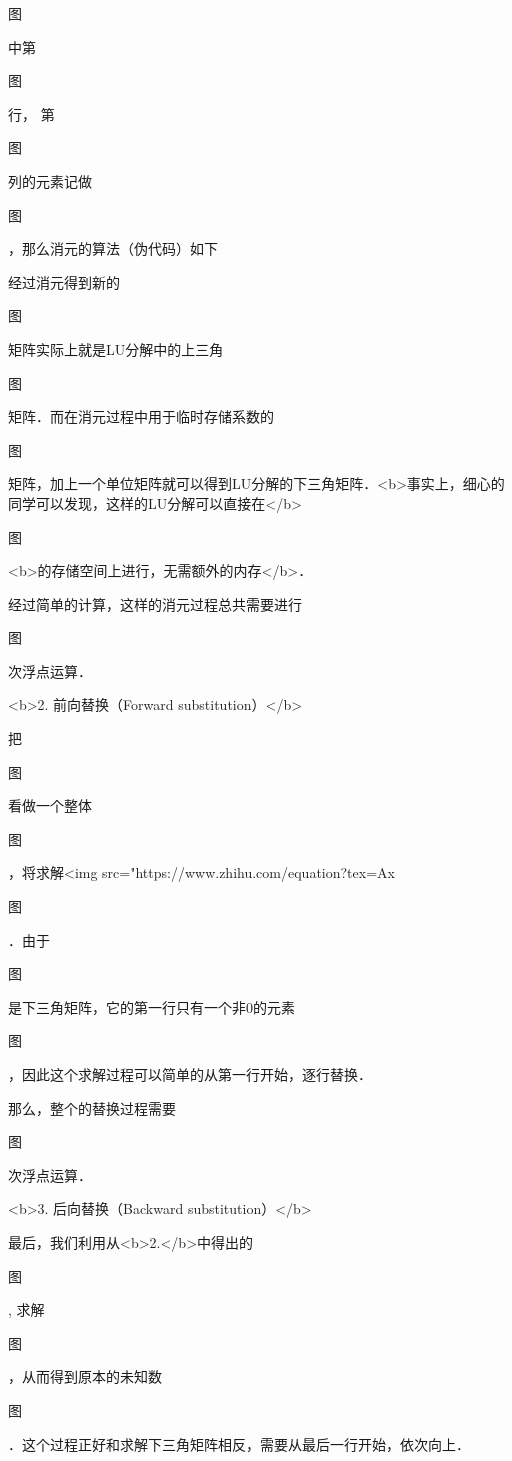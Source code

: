 图

 中第

图

 行， 第

图

 列的元素记做

图

 ，那么消元的算法（伪代码）如下

经过消元得到新的

图

 矩阵实际上就是LU分解中的上三角

图

 矩阵．而在消元过程中用于临时存储系数的

图

 矩阵，加上一个单位矩阵就可以得到LU分解的下三角矩阵．<b>事实上，细心的同学可以发现，这样的LU分解可以直接在</b>

图

 <b>的存储空间上进行，无需额外的内存</b>．

经过简单的计算，这样的消元过程总共需要进行

图

 次浮点运算．

<b>2. 前向替换（Forward substitution）</b>

把

图

 看做一个整体

图

 ，将求解<img src="https://www.zhihu.com/equation?tex=Ax%

图

 ．由于

图

 是下三角矩阵，它的第一行只有一个非0的元素

图

 ，因此这个求解过程可以简单的从第一行开始，逐行替换．

那么，整个的替换过程需要

图

 次浮点运算．

<b>3. 后向替换（Backward substitution）</b>

最后，我们利用从<b>2.</b>中得出的

图

 , 求解

图

 ，从而得到原本的未知数

图

 ．这个过程正好和求解下三角矩阵相反，需要从最后一行开始，依次向上．

